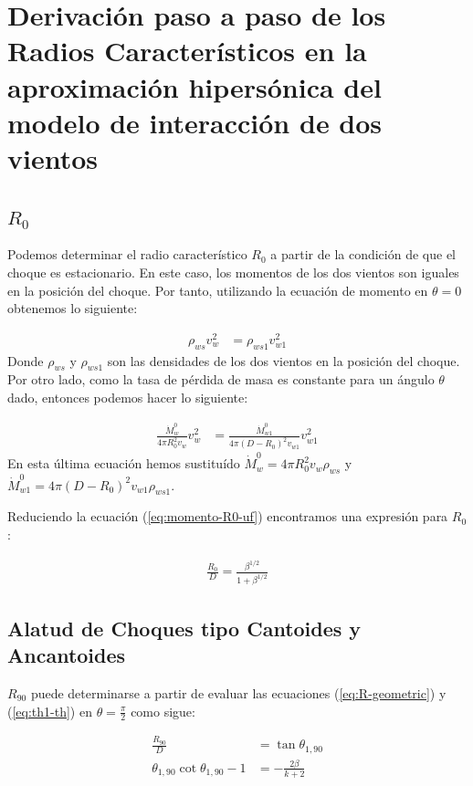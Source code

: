 \chapter{Derivación paso a paso de los Radios Característicos en la aproximación
  hipersónica del modelo de interacción de dos vientos}
\label{app:derivation-radii}

\section{$R_0$}
Podemos determinar el radio característico $R_0$ a partir de la condición de que el choque es estacionario. En este caso,
los momentos de los dos vientos son iguales en la posición del choque. Por tanto, utilizando la ecuación de momento en $\theta=0$
obtenemos lo siguiente:

\begin{align}
  \rho_{ws} v^2_w &= \rho_{ws1} v^2_{w1}
\end{align}
Donde $\rho_{ws}$ y $\rho_{ws1}$ son las densidades de los dos vientos en la posición del choque. Por otro lado, como la tasa de pérdida
de masa es constante para un ángulo $\theta$ dado, entonces podemos hacer lo siguiente:

\begin{align}
  \frac{\dot{M}^0_w}{4\pi R_0^2 v_w}v^2_w &= \frac{\dot{M}^0_{w1}}{4\pi\left(D-R_0\right)^2v_{w1}}v^2_{w1} \label{eq:momento-R0-uf}
\end{align}
En esta última ecuación hemos sustituído $\dot{M}^0_w = 4\pi R_0^2 v_w \rho_{ws}$ y \\
$\dot{M}^0_{w1} = 4\pi \left(D - R_0\right)^2 v_{w1} \rho_{ws1}$.

Reduciendo la ecuación (\ref{eq:momento-R0-uf}) encontramos una expresión para $R_0$:

\begin{align}
  \frac{R_0}{D} = \frac{\beta^{1/2}}{1+\beta^{1/2}}
\end{align}

\section{Alatud de Choques tipo Cantoides y Ancantoides}
$R_{90}$ puede determinarse a partir de evaluar las ecuaciones (\ref{eq:R-geometric}) y (\ref{eq:th1-th}) en $\theta=\frac{\pi}{2}$
como sigue:

\begin{align}
  \frac{R_{90}}{D} &= \tan\theta_{1,90} \\
  \theta_{1,90}\cot\theta_{1,90} -1 &=  - \frac{2\beta}{k+2}
\end{align}

